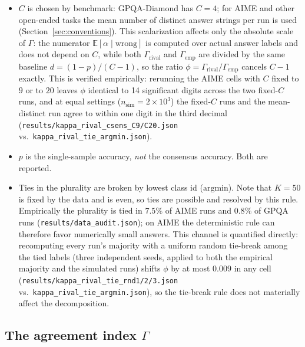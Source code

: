 \documentclass{article}
\newcommand{\agreementIndex}{\Gamma}
\begin{document}
\begin{itemize}
\item $C$ is chosen by benchmark: GPQA-Diamond has $C=4$; for AIME and
  other open-ended tasks the mean number of distinct answer strings per run is used
  (Section~\ref{sec:conventions}).
  \label{item:C}
  This scalarization affects only the absolute scale of $\agreementIndex$: the
  numerator $\mathbb{E}[\alpha\mid\text{wrong}]$ is computed over
  actual answer labels and does not depend on $C$, while both
  $\agreementIndex_{\mathrm{rival}}$ and $\agreementIndex_{\mathrm{emp}}$ are divided by the
  same baseline $d=(1-p)/(C-1)$, so the ratio
  $\phi=\agreementIndex_{\mathrm{rival}}/\agreementIndex_{\mathrm{emp}}$ cancels $C-1$
  exactly. This is verified empirically: rerunning the AIME cells with $C$
  fixed to $9$ or to $20$ leaves $\phi$ identical to 14 significant digits across the two
  fixed-$C$ runs, and at equal settings ($n_{\mathrm{sim}}=2\times10^3$)
  the fixed-$C$ runs and the mean-distinct run agree to within one digit
  in the third decimal
  (\texttt{results/kappa\_rival\_csens\_C9/C20.json} vs.\ 
  \texttt{kappa\_rival\_tie\_argmin.json}).
\item $p$ is the single-sample accuracy, \emph{not} the consensus
  accuracy. Both are reported.
\item Ties in the plurality are broken by lowest class id
  ($\mathrm{argmin}$). Note that $K=50$ is fixed by the data and is
  even, so ties are possible and resolved by this rule. Empirically the
  plurality is tied in $7.5\%$ of AIME runs and $0.8\%$ of GPQA runs (\texttt{results/data\_audit.json});
  on AIME the deterministic rule can therefore favor numerically small
  answers. This channel is quantified directly: recomputing every run's
  majority with a uniform random tie-break among the tied labels (three
  independent seeds, applied to both the empirical majority and the
  simulated runs) shifts $\phi$ by at most $0.009$ in any cell
  (\texttt{results/kappa\_rival\_tie\_rnd1/2/3.json} vs.\
  \texttt{kappa\_rival\_tie\_argmin.json}), so the tie-break rule does
  not materially affect the decomposition.
\end{itemize}

\subsection{The agreement index $\agreementIndex$}
\label{sec:kappa}
\end{document}
